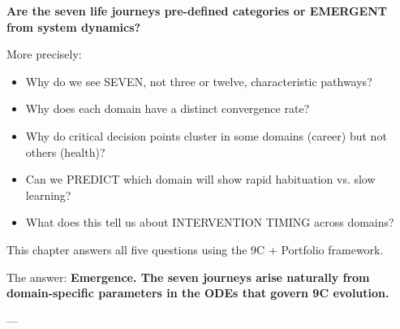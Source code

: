 \begin{tcolorbox}[colback=red!5!white, colframe=red!75!black, title=Central Question of This Chapter]

\textbf{Are the seven life journeys pre-defined categories or EMERGENT from system dynamics?}

\vspace{0.3cm}

More precisely:

\begin{itemize}
\item Why do we see SEVEN, not three or twelve, characteristic pathways?
\item Why does each domain have a distinct convergence rate?
\item Why do critical decision points cluster in some domains (career) but not others (health)?
\item Can we PREDICT which domain will show rapid habituation vs. slow learning?
\item What does this tell us about INTERVENTION TIMING across domains?
\end{itemize}

This chapter answers all five questions using the 9C + Portfolio framework.

The answer: \textbf{Emergence. The seven journeys arise naturally from domain-specific parameters in the ODEs that govern 9C evolution.}

\end{tcolorbox}

---


